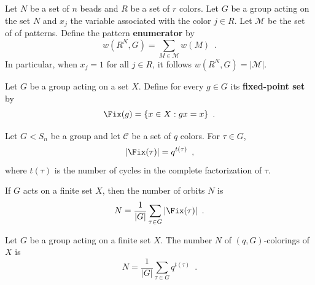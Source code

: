 \begin{definition}
	\cite[85]{Aigner2007}
	Let $N$ be a set of $n$ beads and $R$ be a set of $r$ colors. Let $G$ be a group acting
	on the set $N$ and $x_j$ the variable associated with the color $j \in R$. Let
	$\mathcal{M}$ be the set of of patterns. Define the pattern \textbf{enumerator} by
	\begin{equation}
		w(R^N, G) = \sum_{M \in \mathcal{M}} w(M) \enspace.
	\end{equation}
	In particular, when $x_j = 1$ for all $j \in R$, it follows $w(R^N, G) = |\mathcal{M}|$.
\end{definition}

\begin{definition}
	\cite[86]{Aigner2007}
	Let $G$ be a group acting on a set $X$. Define for every $g \in G$ its
	\textbf{fixed-point set} by 
	\begin{equation}
		\Fix(g) = \{ x \in X : gx = x \} \enspace.
	\end{equation}
\end{definition}

\begin{lemma}
	\cite[112]{Rotman1967}
	Let $G < S_n$ be a group and let $\mathcal{C}$ be a set of $q$ colors. For $\tau \in G$,
	\begin{equation}
		|\Fix(\tau)| = q^{t(\tau)} \enspace,
	\end{equation}
	where $t(\tau)$ is the number of cycles in the complete factorization of $\tau$.
\end{lemma}

\begin{lemma}[Burnside]
	\cite[109]{Rotman1967}
	\cite[251]{Tucker1974}
	If $G$ acts on a finite set $X$, then the number of orbits $N$ is
	\begin{equation}
		N = \frac{1}{|G|} \sum_{\tau \in G} |\Fix(\tau)| \enspace.
	\end{equation}
\end{lemma}

\begin{corollary}
	\cite[112]{Rotman1967}
	Let $G$ be a group acting on a finite set $X$. The number $N$ of $(q, G)$-colorings
	of $X$ is
	\begin{equation}
		N = \frac{1}{|G|} \sum_{\tau \in G} q^{t(\tau)} \enspace.
	\end{equation}
\end{corollary}

